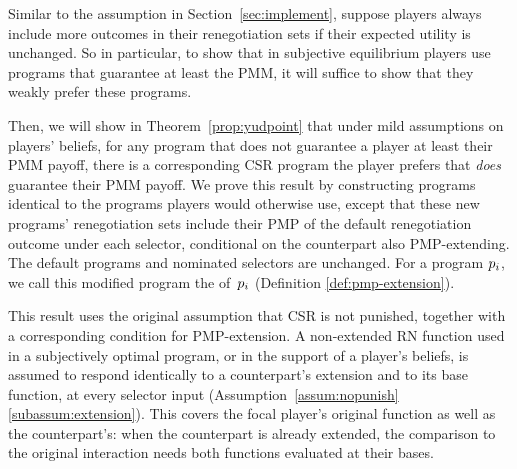 \documentclass[sigconf]{aamas}
\theoremstyle{definition}
\begin{document}

Similar to the
assumption
in Section~\ref{sec:implement},
suppose
players always include
more outcomes in their renegotiation
sets if their expected
utility is unchanged.
So in particular, to show that in subjective equilibrium players use programs
that guarantee at least the PMM,
it will suffice to show that
they weakly prefer these programs.

Then, 
we will show in
Theorem~\ref{prop:yudpoint}
that
under
mild assumptions on players' beliefs,
for any program
that
does not guarantee
a player at least
their PMM payoff,
there is a corresponding CSR
program the player prefers
that \textit{does}
guarantee their PMM
payoff.
We prove this
result
by constructing programs identical
to the programs
players would otherwise use,
except that these new programs'
renegotiation sets include their PMP of the default renegotiation
outcome under each selector, conditional on the counterpart also
PMP-extending. The default programs and nominated selectors are unchanged.
For a program $p_i$, we call this 
modified program the 
 of~$p_i$ 
(Definition \ref{def:pmp-extension}).

This result uses the original assumption that CSR is not punished,
together with a corresponding condition for PMP-extension.
A non-extended RN function used in a subjectively optimal program, or
in the support of a player's beliefs, is assumed to respond identically
to a counterpart's extension and to its base function, at every
selector input (Assumption~\ref{assum:nopunish}\ref{subassum:extension}).
This covers the focal player's original function as well as the
counterpart's: when the counterpart is already extended, the comparison
to the original interaction needs both functions evaluated at their bases.
\end{document}
